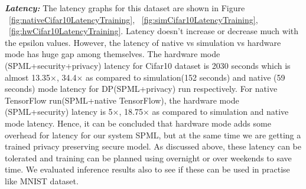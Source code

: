 \newline
\newline
\textbf{\textit{Latency: }}The latency graphs for this dataset are shown in Figure ~\ref{fig:nativeCifar10LatencyTraining}, ~\ref{fig:simCifar10LatencyTraining}, ~\ref{fig:hwCifar10LatencyTraining}. Latency doesn't increase or decrease much with the epsilon values. However, the latency of native vs simulation vs hardware mode has huge gap among themselves. The hardware mode (SPML+security+privacy) latency for Cifar10 dataset is 2030 seconds which is almost 13.35$\times$, 34.4$\times$ as compared to simulation(152 seconds) and native (59 seconds) mode latency for DP(SPML+privacy) run respectively. For native TensorFlow run(SPML+native TensorFlow), the hardware mode (SPML+security) latency is 5$\times$, 18.75$\times$ as compared to simulation and native mode latency. Hence, it can be concluded that hardware mode adds some overhead for latency for our system SPML, but at the same time we are getting a trained privacy preserving secure model. As discussed above, these latency can be tolerated and training can be planned using overnight or over weekends to save time. We evaluated inference results also to see if these can be used in practise like MNIST dataset.

